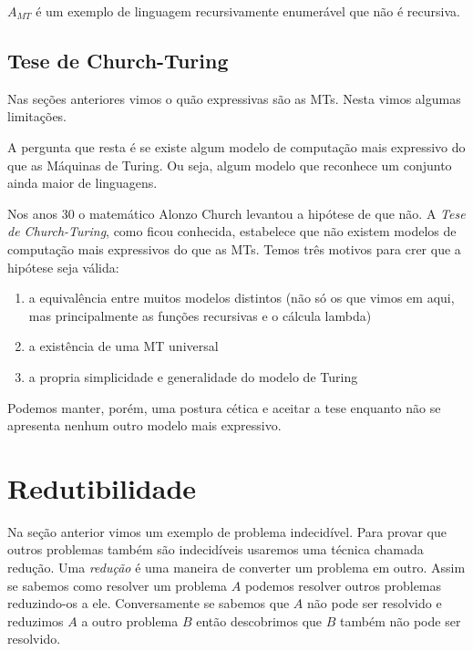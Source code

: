 $A_{MT}$ é um exemplo de linguagem recursivamente enumerável que não é recursiva.

\subsection*{Tese de Church-Turing}

Nas seções anteriores vimos o quão expressivas são as MTs.
Nesta vimos algumas limitações.

A pergunta que resta é se existe algum modelo de computação mais expressivo do que as Máquinas de Turing.
Ou seja, algum modelo que reconhece um conjunto ainda maior de linguagens.

Nos anos 30 o matemático Alonzo Church levantou a hipótese de que não.
A {\em Tese de Church-Turing}, como ficou conhecida, estabelece que não existem modelos de computação mais expressivos do que as MTs.
Temos três motivos para crer que a hipótese seja válida:
\begin{enumerate}
\item a equivalência entre muitos modelos distintos (não só os que vimos em aqui, mas principalmente as funções recursivas e o cálcula lambda)
\item a existência de uma MT universal
\item a propria simplicidade e generalidade do modelo de Turing
\end{enumerate}

Podemos manter, porém, uma postura cética e aceitar a tese enquanto não se apresenta nenhum outro modelo mais expressivo.

\section{Redutibilidade}
\label{sec:redutibilidade}

Na seção anterior vimos um exemplo de problema indecidível.
Para provar que outros problemas também são indecidíveis usaremos uma técnica chamada redução.
Uma {\em redução} é uma maneira de converter um problema em outro.
Assim se sabemos como resolver um problema $A$ podemos resolver outros problemas reduzindo-os a ele.
Conversamente se sabemos que $A$ não pode ser resolvido e reduzimos $A$ a outro problema $B$ então descobrimos que $B$ também não pode ser resolvido.

